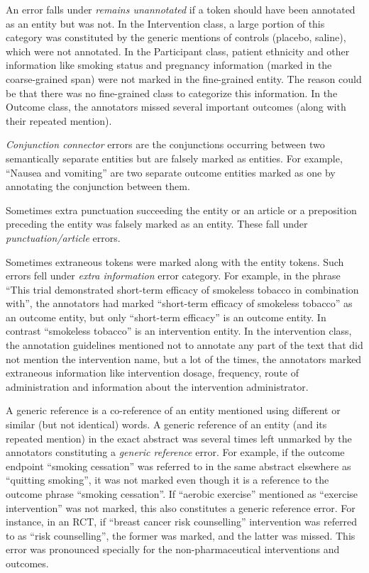 \documentclass[10.7pt,]{article}
\begin{document}
An error falls under \textit{remains unannotated} if a token should have been annotated as an entity but was not.
In the Intervention class, a large portion of this category was constituted by the generic mentions of controls (placebo, saline), which were not annotated.
In the Participant class, patient ethnicity and other information like smoking status and pregnancy information (marked in the coarse-grained span) were not marked in the fine-grained entity.
The reason could be that there was no fine-grained class to categorize this information. 
In the Outcome class, the annotators missed several important outcomes (along with their repeated mention).

\textit{Conjunction connector} errors are the conjunctions occurring between two semantically separate entities but are falsely marked as entities.
For example, ``Nausea and vomiting'' are two separate outcome entities marked as one by annotating the conjunction between them.

Sometimes extra punctuation succeeding the entity or an article or a preposition preceding the entity was falsely marked as an entity. These fall under \textit{punctuation/article} errors.

Sometimes extraneous tokens were marked along with the entity tokens. 
Such errors fell under \textit{extra information} error category.
For example, in the phrase ``This trial demonstrated short-term efficacy of smokeless tobacco in combination with'', the annotators had marked ``short-term efficacy of smokeless tobacco'' as an outcome entity, but only ``short-term efficacy'' is an outcome entity. In contrast ``smokeless tobacco'' is an intervention entity. 
In the intervention class, the annotation guidelines mentioned not to annotate any part of the text that did not mention the intervention name, but a lot of the times, the annotators marked extraneous information like intervention dosage, frequency, route of administration and information about the intervention administrator.


A generic reference is a co-reference of an entity mentioned using different or similar (but not identical) words. 
A generic reference of an entity (and its repeated mention) in the exact abstract was several times left unmarked by the annotators constituting a \textit{generic reference} error.
For example, if the outcome endpoint ``smoking cessation'' was referred to in the same abstract elsewhere as ``quitting smoking'', it was not marked even though it is a reference to the outcome phrase ``smoking cessation''.
If ``aerobic exercise'' mentioned as ``exercise intervention'' was not marked, this also constitutes a generic reference error.
For instance, in an RCT, if ``breast cancer risk counselling'' intervention was referred to as ``risk counselling'', the former was marked, and the latter was missed.
This error was pronounced specially for the non-pharmaceutical interventions and outcomes.
\end{document}
